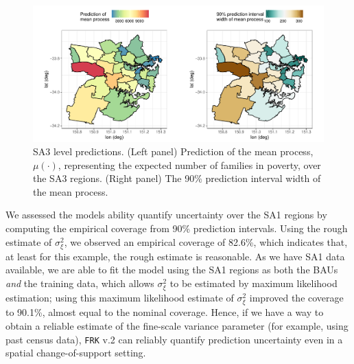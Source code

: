 \documentclass[12pt,a4paper]{article}
\begin{document}
\begin{figure}[t!]
    \centering
    \includegraphics[width = \linewidth]{Images/Sydney_SA3_predictions.pdf}
    \caption{SA3 level predictions. (Left panel) Prediction of the mean process, $\mu(\cdot)$, representing the expected number of families in poverty, over the SA3 regions. (Right panel) The 90\% prediction interval width of the mean process.
}   
  \label{fig:SA3_predictions}
\end{figure}




 We assessed the models ability quantify uncertainty over the SA1 regions by computing the empirical coverage from 90\% prediction intervals. 
 Using the rough estimate of $\sigma^2_\xi$, we observed an empirical coverage of 82.6\%, which indicates that, at least for this example, the rough estimate is reasonable. 
As we have SA1 data available, we are able to fit the model using the SA1 regions as both the BAUs \textit{and} the training data, which allows $\sigma^2_\xi$ to be estimated by maximum likelihood estimation; %
 using this maximum likelihood estimate of $\sigma^2_\xi$ improved the coverage to 90.1\%, almost equal to the nominal coverage.
 Hence, if we have a way to obtain a reliable estimate of the fine-scale variance parameter (for example, using past census data), \texttt{FRK} v.2 can reliably quantify prediction uncertainty even in a spatial change-of-support setting. 
 
\end{document}
